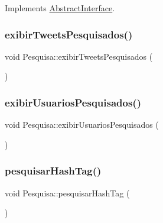 Implements \hyperlink{class_abstract_interface_a1d5d2a15e6e640bd0190a835cb64e5ed}{Abstract\+Interface}.

\mbox{\label{class_pesquisa_aff21347ac401cdb4a2dcdafff8c6f98e}} 
\subsubsection{\texorpdfstring{exibir\+Tweets\+Pesquisados()}{exibirTweetsPesquisados()}}
{\footnotesize\ttfamily void Pesquisa\+::exibir\+Tweets\+Pesquisados (\begin{DoxyParamCaption}{ }\end{DoxyParamCaption})\hspace{0.3cm}{\ttfamily [private]}}

\mbox{\label{class_pesquisa_a8baacaa888e287c3c681323d9ebe5c18}} 
\subsubsection{\texorpdfstring{exibir\+Usuarios\+Pesquisados()}{exibirUsuariosPesquisados()}}
{\footnotesize\ttfamily void Pesquisa\+::exibir\+Usuarios\+Pesquisados (\begin{DoxyParamCaption}{ }\end{DoxyParamCaption})\hspace{0.3cm}{\ttfamily [private]}}

\mbox{\label{class_pesquisa_a5d31daf2e13d7d4798409f1c5fe15066}} 
\subsubsection{\texorpdfstring{pesquisar\+Hash\+Tag()}{pesquisarHashTag()}}
{\footnotesize\ttfamily void Pesquisa\+::pesquisar\+Hash\+Tag (\begin{DoxyParamCaption}{ }\end{DoxyParamCaption})\hspace{0.3cm}{\ttfamily [private]}}


